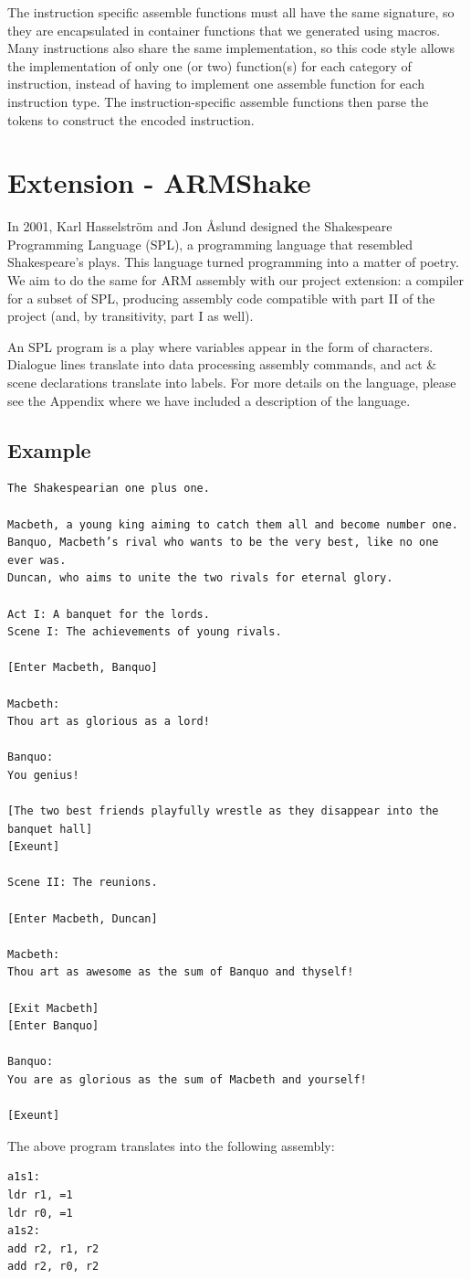 \documentclass[11pt]{article}
\begin{document}
The instruction specific assemble functions must all have the same signature, so they are encapsulated in container functions that we generated using macros. Many instructions also share the same implementation, so this code style allows the implementation of only one (or two) function(s) for each category of instruction, instead of having to implement one assemble function for each instruction type. The instruction-specific assemble functions then parse the tokens to construct the encoded instruction.

\section{Extension - ARMShake}

In 2001, Karl Hasselström and Jon Åslund designed the Shakespeare Programming Language (SPL), a programming language that resembled Shakespeare’s plays. This language turned programming into a matter of poetry. We aim to do the same for ARM assembly with our project extension: a compiler for a subset of SPL, producing assembly code compatible with part II of the project (and, by transitivity, part I as well).

An SPL program is a play where variables appear in the form of characters. Dialogue lines translate into data processing assembly commands, and act \& scene declarations translate into labels. For more details on the language, please see the Appendix where we have included a description of the language.

\subsection{Example}
\begin{verbatim}
The Shakespearian one plus one.

Macbeth, a young king aiming to catch them all and become number one.
Banquo, Macbeth’s rival who wants to be the very best, like no one ever was.
Duncan, who aims to unite the two rivals for eternal glory.

Act I: A banquet for the lords.
Scene I: The achievements of young rivals.

[Enter Macbeth, Banquo]

Macbeth:
Thou art as glorious as a lord!

Banquo:
You genius!

[The two best friends playfully wrestle as they disappear into the banquet hall]
[Exeunt]

Scene II: The reunions.

[Enter Macbeth, Duncan]

Macbeth:
Thou art as awesome as the sum of Banquo and thyself!

[Exit Macbeth]
[Enter Banquo]

Banquo:
You are as glorious as the sum of Macbeth and yourself!

[Exeunt]
\end{verbatim}
The above program translates into the following assembly:
\begin{verbatim}
a1s1:
ldr r1, =1
ldr r0, =1
a1s2:
add r2, r1, r2
add r2, r0, r2
\end{verbatim}
\end{document}
